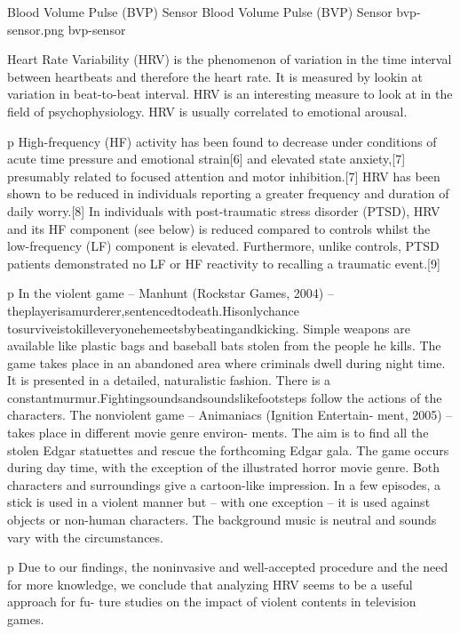 \img
{Blood Volume Pulse (BVP) Sensor}
{Blood Volume Pulse (BVP) Sensor}
{bvp-sensor.png}
{bvp-sensor}

Heart Rate Variability (HRV) is the phenomenon of variation in the time interval between heartbeats and therefore the heart rate. It is measured by lookin at variation in beat-to-beat interval. HRV is an interesting measure to look at in the field of psychophysiology. HRV is usually correlated to emotional arousal. %

p High-frequency (HF) activity has been found to decrease under conditions of acute time pressure and emotional strain[6] and elevated state anxiety,[7] presumably related to focused attention and motor inhibition.[7] HRV has been shown to be reduced in individuals reporting a greater frequency and duration of daily worry.[8] In individuals with post-traumatic stress disorder (PTSD), HRV and its HF component (see below) is reduced compared to controls whilst the low-frequency (LF) component is elevated. Furthermore, unlike controls, PTSD patients demonstrated no LF or HF reactivity to recalling a traumatic event.[9]

p In the violent game – Manhunt (Rockstar Games, 2004) – theplayerisamurderer,sentencedtodeath.Hisonlychance tosurviveistokilleveryonehemeetsbybeatingandkicking. Simple weapons are available like plastic bags and baseball bats stolen from the people he kills. The game takes place in an abandoned area where criminals dwell during night time. It is presented in a detailed, naturalistic fashion. There is a constantmurmur.Fightingsoundsandsoundslikefootsteps follow the actions of the characters. The nonviolent game – Animaniacs (Ignition Entertain- ment, 2005) – takes place in different movie genre environ- ments. The aim is to find all the stolen Edgar statuettes and rescue the forthcoming Edgar gala. The game occurs during day time, with the exception of the illustrated horror movie genre. Both characters and surroundings give a cartoon-like impression. In a few episodes, a stick is used in a violent manner but – with one exception – it is used against objects or non-human characters. The background music is neutral and sounds vary with the circumstances.

p Due to our findings, the noninvasive and well-accepted procedure and the need for more knowledge, we conclude that analyzing HRV seems to be a useful approach for fu- ture studies on the impact of violent contents in television games.


